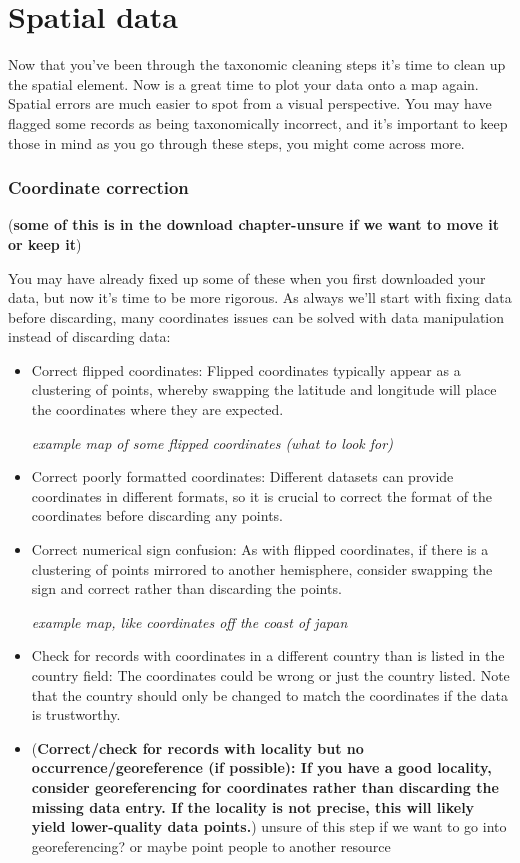 \documentclass[
  letterpaper,
  DIV=11,
  numbers=noendperiod,
  oneside]{scrreprt}
\begin{document}

\hypertarget{sec-spatial}{%
\chapter{Spatial data}\label{sec-spatial}}

Now that you've been through the taxonomic cleaning steps it's time to
clean up the spatial element. Now is a great time to plot your data onto
a map again. Spatial errors are much easier to spot from a visual
perspective. You may have flagged some records as being taxonomically
incorrect, and it's important to keep those in mind as you go through
these steps, you might come across more.

\hypertarget{coordinate-correction}{%
\subsection{Coordinate correction}\label{coordinate-correction}}

(\textbf{some of this is in the download chapter-unsure if we want to
move it or keep it})

You may have already fixed up some of these when you first downloaded
your data, but now it's time to be more rigorous. As always we'll start
with fixing data before discarding, many coordinates issues can be
solved with data manipulation instead of discarding data:

\begin{itemize}
\item
  Correct flipped coordinates: Flipped coordinates typically appear as a
  clustering of points, whereby swapping the latitude and longitude will
  place the coordinates where they are expected.

  \emph{example map of some flipped coordinates (what to look for)}
\item
  Correct poorly formatted coordinates: Different datasets can provide
  coordinates in different formats, so it is crucial to correct the
  format of the coordinates before discarding any points.
\item
  Correct numerical sign confusion: As with flipped coordinates, if
  there is a clustering of points mirrored to another hemisphere,
  consider swapping the sign and correct rather than discarding the
  points.

  \emph{example map, like coordinates off the coast of japan}
\item
  Check for records with coordinates in a different country than is
  listed in the country field: The coordinates could be wrong or just
  the country listed. Note that the country should only be changed to
  match the coordinates if the data is trustworthy.
\item
  (\textbf{Correct/check for records with locality but no
  occurrence/georeference (if possible): If you have a good locality,
  consider georeferencing for coordinates rather than discarding the
  missing data entry. If the locality is not precise, this will likely
  yield lower-quality data points.}) unsure of this step if we want to
  go into georeferencing? or maybe point people to another resource
\end{itemize}
\end{document}
